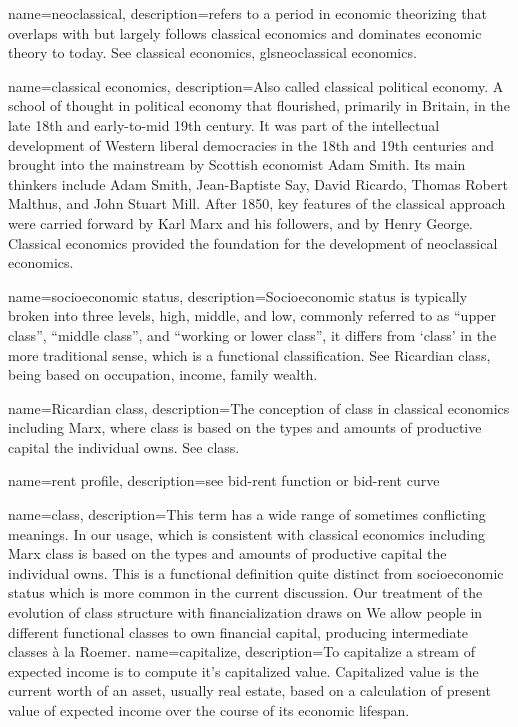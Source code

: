 {
name=neoclassical,
description={refers to a period in economic theorizing that overlaps with  but largely follows classical economics and dominates economic theory to  today. See \gls{classical economics}, gls{neoclassical economics}.}
}

{
name=classical economics,
description={Also called classical \gls{political economy}. A school of thought in political economy that flourished, primarily in Britain, in the late 18th and early-to-mid 19th century. It was part of the intellectual  development of  Western liberal democracies in the 18th and 19th centuries and  brought into the mainstream by Scottish economist Adam Smith. Its main thinkers include Adam Smith, Jean-Baptiste Say, David Ricardo, Thomas Robert Malthus, and John Stuart Mill. After 1850, key features of the classical approach were carried forward by  Karl Marx and his followers, and by Henry George. Classical economics  provided the foundation for the development of \gls{neoclassical economics}.}
}

{
name=socioeconomic status,
description={Socioeconomic status is typically broken into three levels, high, middle, and low,  commonly referred to as ``upper class'', ``middle class'', and ``working or lower class'', it differs from `\gls{class}' in the more traditional sense, which is a functional classification. See \gls{Ricardian class}, being based on occupation, income, family wealth.}
}

{
name=Ricardian class,
description={The conception of class in \gls{classical economics} including Marx, where class is based on the types and amounts of productive capital the individual owns. See \gls{class}.}
}

{
name=rent profile,
description={see \gls{bid-rent function} or \gls{bid-rent curve}}
}

{
name=class,
description={This term has a wide range of sometimes conflicting meanings. In our usage, which is consistent with classical economics including Marx class is based on the types and amounts of productive capital the individual owns. This is a functional definition quite distinct from socioeconomic status which is more common in the current discussion. Our treatment of the evolution of class structure with financialization draws on We allow  people in different functional classes to own financial capital, producing intermediate classes \`a la Roemer\cite{roemerGeneralTheoryExploitation1982}.}
}
{
name=capitalize,
description={To capitalize a stream of expected income is to compute it's capitalized value. Capitalized value is the current worth of an asset, usually real estate, based on a calculation of present value of expected income over the course of its economic lifespan.}
}

